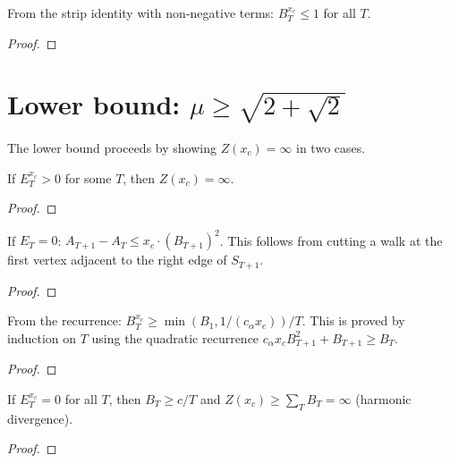 \begin{theorem}\label{thm:bridge_bound}
\leanok
{}
  From the strip identity with non-negative terms:
  $B_T^{x_c} \leq 1$ for all $T$.
\end{theorem}
\begin{proof}
\leanok
\end{proof}


\section{Lower bound: $\mu \geq \sqrt{2+\sqrt{2}}$}

The lower bound proceeds by showing $Z(x_c) = \infty$ in two cases.

\begin{theorem}[Case~1: $E_T > 0 \Rightarrow Z = \infty$]\label{thm:case1}
\leanok
{}
  If $E_T^{x_c} > 0$ for some $T$, then $Z(x_c) = \infty$.
\end{theorem}
\begin{proof}
\leanok
\end{proof}

\begin{theorem}\label{thm:recurrence}
\leanok
{}
  If $E_T = 0$: $A_{T+1} - A_T \leq x_c \cdot (B_{T+1})^2$.
  This follows from cutting a walk at the first vertex adjacent to the right edge of $S_{T+1}$.
\end{theorem}
\begin{proof}
\leanok
\end{proof}

\begin{theorem}\label{thm:bridge_lower}
\leanok
{}
  From the recurrence: $B_T^{x_c} \geq \min(B_1, 1/(c_\alpha x_c)) / T$.
  This is proved by induction on $T$ using the quadratic recurrence
  $c_\alpha x_c B_{T+1}^2 + B_{T+1} \geq B_T$.
\end{theorem}
\begin{proof}
\leanok
\end{proof}

\begin{theorem}[Case~2: $E_T = 0$ for all $T$]\label{thm:case2}
\leanok
{}
  If $E_T^{x_c} = 0$ for all $T$, then $B_T \geq c/T$ and
  $Z(x_c) \geq \sum_T B_T = \infty$ (harmonic divergence).
\end{theorem}
\begin{proof}
\leanok
\end{proof}

